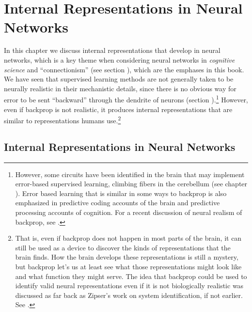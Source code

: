 \chapter{Internal Representations in Neural Networks}\label{ch_representations}

In this chapter we discuss internal representations that develop in neural networks, which is a key theme when considering neural networks in \emph{cognitive science} and ``connectionism'' (see section ), which are the emphases in this book. We have seen that  supervised learning methods are not generally taken to be neurally realistic in their mechanistic details, since there is no obvious way for error to be sent ``backward'' through the dendrite of neurons (section ).\footnote{However, some circuits have been identified in the brain that may implement error-based supervised learning, \eg climbing fibers in the cerebellum (see chapter ). Error based learning that is similar in some ways to backprop is also emphasized in predictive coding accounts of the brain and predictive processing accounts of cognition. For a  recent discussion of neural realism of backprop, see \cite{whittington2019theories}.}  However, even if backprop is not realistic, it produces internal representations that are similar to representations humans use.\footnote{That is, even if backprop does not happen in most parts of the brain, it can still be used as a device to discover the kinds of representations that the brain finds. How the brain develops these representations is still a mystery, but backprop let's us at least see what those representations might look like and what function they might serve. The idea that backprop could be used to identify valid neural representations even if it is not biologically realistic was discussed as far back as Zipser's work on system identification, if not earlier. See \cite{zipser1992identification}.}

\section{Internal Representations in Neural Networks}


